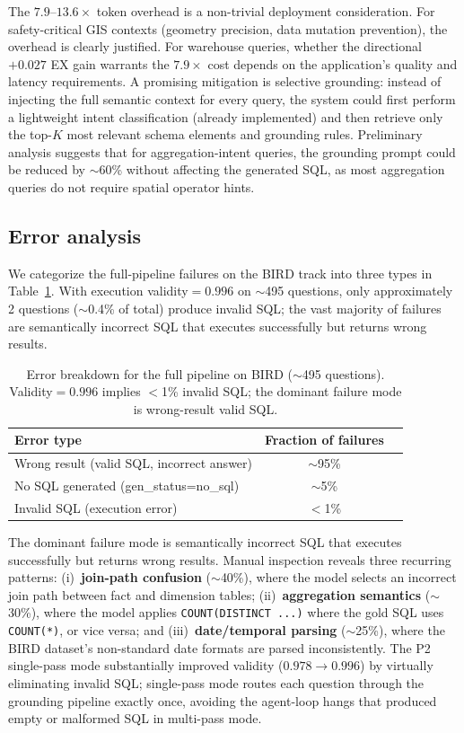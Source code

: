\documentclass[11pt]{article}
\begin{document}
The $7.9$--$13.6\times$ token overhead is a non-trivial deployment consideration. For safety-critical GIS contexts (geometry precision, data mutation prevention), the overhead is clearly justified. For warehouse queries, whether the directional $+0.027$ EX gain warrants the $7.9\times$ cost depends on the application's quality and latency requirements. A promising mitigation is selective grounding: instead of injecting the full semantic context for every query, the system could first perform a lightweight intent classification (already implemented) and then retrieve only the top-$K$ most relevant schema elements and grounding rules. Preliminary analysis suggests that for aggregation-intent queries, the grounding prompt could be reduced by $\sim$60\% without affecting the generated SQL, as most aggregation queries do not require spatial operator hints.

\subsection{Error analysis}
\label{sec:error}

We categorize the full-pipeline failures on the BIRD track into three types in Table~\ref{tab:errors}. With execution validity$=0.996$ on $\sim$495 questions, only approximately 2 questions ($\sim$0.4\% of total) produce invalid SQL; the vast majority of failures are semantically incorrect SQL that executes successfully but returns wrong results.

\begin{table}[t]
\centering
\caption{Error breakdown for the full pipeline on BIRD ($\sim$495 questions). Validity$=0.996$ implies $<$1\% invalid SQL; the dominant failure mode is wrong-result valid SQL.}
\label{tab:errors}
\begin{tabular}{lcc}
\toprule
Error type & Fraction of failures \\
\midrule
Wrong result (valid SQL, incorrect answer) & $\sim$95\% \\
No SQL generated (gen\_status=no\_sql)      & $\sim$5\% \\
Invalid SQL (execution error)               & $<$1\% \\
\bottomrule
\end{tabular}
\end{table}

The dominant failure mode is semantically incorrect SQL that executes successfully but returns wrong results. Manual inspection reveals three recurring patterns: (i)~\textbf{join-path confusion} ($\sim$40\%), where the model selects an incorrect join path between fact and dimension tables; (ii)~\textbf{aggregation semantics} ($\sim$30\%), where the model applies \texttt{COUNT(DISTINCT ...)} where the gold SQL uses \texttt{COUNT(*)}, or vice versa; and (iii)~\textbf{date/temporal parsing} ($\sim$25\%), where the BIRD dataset's non-standard date formats are parsed inconsistently. The P2 single-pass mode substantially improved validity ($0.978\to0.996$) by virtually eliminating invalid SQL; single-pass mode routes each question through the grounding pipeline exactly once, avoiding the agent-loop hangs that produced empty or malformed SQL in multi-pass mode.
\end{document}
